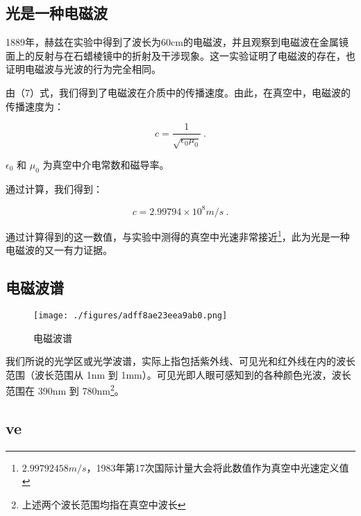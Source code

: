 \subsection{光是一种电磁波}

1889年，赫兹在实验中得到了波长为60cm的电磁波，并且观察到电磁波在金属镜面上的反射与在石蜡棱镜中的折射及干涉现象。这一实验证明了电磁波的存在，也证明电磁波与光波的行为完全相同。

由（7）式，我们得到了电磁波在介质中的传播速度。由此，在真空中，电磁波的传播速度为：

\begin{equation}
c = \frac{1}{\sqrt{\epsilon_0 \mu_0}} ~.
\end{equation}

$\epsilon_0$ 和 $\mu_0$ 为真空中介电常数和磁导率。

通过计算，我们得到：

\begin{equation}
c = 2.99794 \times 10^8 m/s~.
\end{equation}

通过计算得到的这一数值，与实验中测得的真空中光速非常接近\footnote{$2.99792458m/s$，1983年第17次国际计量大会将此数值作为真空中光速定义值}，此为光是一种电磁波的又一有力证据。

\subsection{电磁波谱}

\begin{figure}[ht]
\centering
\texttt{[image: ./figures/adff8ae23eea9ab0.png]}
\caption{电磁波谱} \label{fig_WaOp1_1}
\end{figure}

我们所说的光学区或光学波谱，实际上指包括紫外线、可见光和红外线在内的波长范围（波长范围从 1nm 到 1mm）。可见光即人眼可感知到的各种颜色光波，波长范围在 390nm 到 780nm\footnote{上述两个波长范围均指在真空中波长}。

\subsection{ve}
